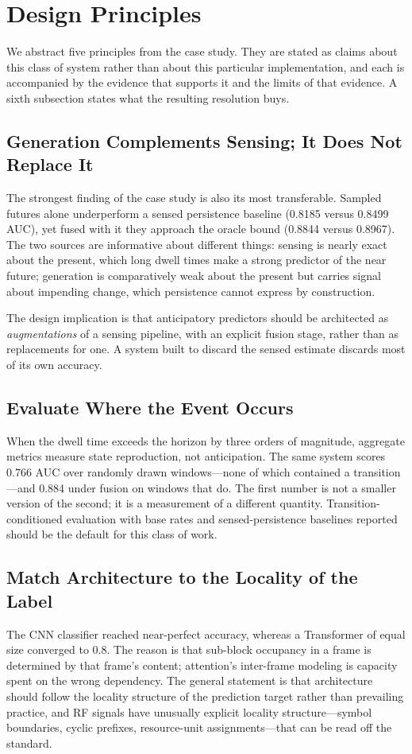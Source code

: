 \documentclass[lettersize,journal]{IEEEtran}
\begin{document}
\section{Design Principles}

We abstract five principles from the case study. They are stated as
claims about this class of system rather than about this particular
implementation, and each is accompanied by the evidence that supports it
and the limits of that evidence. A sixth subsection states what the
resulting resolution buys.

\subsection{Generation Complements Sensing; It Does Not Replace It}
The strongest finding of the case study is also its most transferable.
Sampled futures alone underperform a sensed persistence baseline
(0.8185 versus 0.8499 AUC), yet fused with it they approach the oracle
bound (0.8844 versus 0.8967). The two sources are informative about
different things: sensing is nearly exact about the present, which
long dwell times make a strong predictor of the near future; generation
is comparatively weak about the present but carries signal about
impending change, which persistence cannot express by construction.

The design implication is that anticipatory predictors should be
architected as \emph{augmentations} of a sensing pipeline, with an
explicit fusion stage, rather than as replacements for one. A system
built to discard the sensed estimate discards most of its own accuracy.

\subsection{Evaluate Where the Event Occurs}
When the dwell time exceeds the horizon by three orders of magnitude,
aggregate metrics measure state reproduction, not anticipation. The
same system scores 0.766 AUC over randomly drawn windows---none of which
contained a transition---and 0.884 under fusion on windows that do. The
first number is not a smaller version of the second; it is a
measurement of a different quantity. Transition-conditioned evaluation
with base rates and sensed-persistence baselines reported should be the
default for this class of work.

\subsection{Match Architecture to the Locality of the Label}
The CNN classifier reached near-perfect accuracy, whereas a Transformer of
equal size converged to 0.8. The reason is that sub-block occupancy in a
frame is determined by that frame's content; attention's inter-frame
modeling is capacity spent on the wrong dependency. The general
statement is that architecture should follow the locality structure of
the prediction target rather than prevailing practice, and RF signals
have unusually explicit locality structure---symbol boundaries, cyclic
prefixes, resource-unit assignments---that can be read off the standard.
\end{document}
